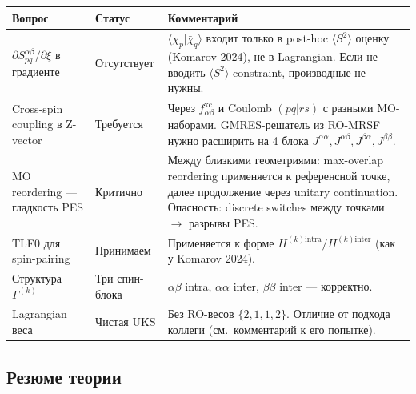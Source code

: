 \documentclass[11pt, a4paper]{article}
\theoremstyle{definition}
\newcommand{\Hkintra}{H^{(k)\text{intra}}}
\newcommand{\Hkinter}{H^{(k)\text{inter}}}
\newcommand{\xc}{\text{xc}}
\begin{document}
\begin{center}
\begin{tabularx}{\textwidth}{lXX}
\toprule
Вопрос & Статус & Комментарий \\
\midrule
$\partial S^{\alpha\beta}_{pq}/\partial \xi$ в градиенте & Отсутствует & $\langle \chi_p | \bar\chi_q \rangle$ входит только в post-hoc $\langle S^2 \rangle$ оценку (Komarov 2024), не в Lagrangian. Если не вводить $\langle S^2 \rangle$-constraint, производные не нужны. \\
\addlinespace
Cross-spin coupling в Z-vector & Требуется & Через $f^{\xc}_{\alpha\beta}$ и Coulomb $(pq|rs)$ с разными MO-наборами. GMRES-решатель из RO-MRSF нужно расширить на 4 блока $J^{\alpha\alpha}, J^{\alpha\beta}, J^{\beta\alpha}, J^{\beta\beta}$. \\
\addlinespace
MO reordering --- гладкость PES & Критично & Между близкими геометриями: max-overlap reordering применяется к референсной точке, далее продолжение через unitary continuation. Опасность: discrete switches между точками $\to$ разрывы PES. \\
\addlinespace
TLF0 для spin-pairing & Принимаем & Применяется к форме $\Hkintra/\Hkinter$ (как у Komarov 2024). \\
\addlinespace
Структура $\Gamma^{(k)}$ & Три спин-блока & $\alpha\beta$ intra, $\alpha\alpha$ inter, $\beta\beta$ inter --- корректно. \\
\addlinespace
Lagrangian веса & Чистая UKS & Без RO-весов $\{2, 1, 1, 2\}$. Отличие от подхода коллеги (см.\ комментарий к его попытке). \\
\bottomrule
\end{tabularx}
\end{center}

\subsection{Резюме теории}
\end{document}
